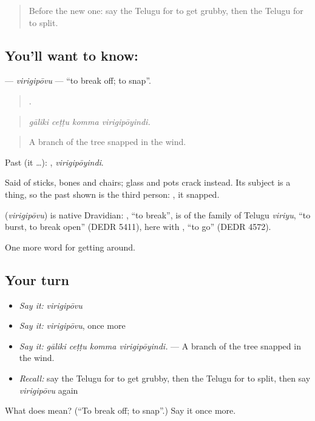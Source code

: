 \label{lesson:TE-C490-virigipovu}



\begin{quote}
Before the new one: say the Telugu for to get grubby, then the Telugu for to split.
\end{quote}

\subsection*{You'll want to know: }
\textbf{} — \emph{virigipōvu} — \textquotedblleft{}to break off; to snap\textquotedblright{}.

\begin{quote}
   .
\end{quote}

\begin{quote}
\emph{gāliki ceṭṭu komma virigipōyindi.}
\end{quote}

\begin{quote}
A branch of the tree snapped in the wind.
\end{quote}

Past (it …): , \emph{virigipōyindi}.

Said of sticks, bones and chairs; glass and pots crack instead. Its subject is a thing, so the past shown is the third person: , it snapped.

\begin{cousinweb}
\textbf{} (\emph{virigipōvu}) is native Dravidian: , \textquotedblleft{}to break\textquotedblright{}, is of the family of Telugu \emph{viriyu}, \textquotedblleft{}to burst, to break open\textquotedblright{} (DEDR 5411), here with , \textquotedblleft{}to go\textquotedblright{} (DEDR 4572).
\end{cousinweb}

\begin{grammarlens}[title={What you've built}]
One more word for getting around.
\end{grammarlens}

\subsection*{Your turn}
\begin{itemize}
\raggedright
  \item \emph{Say it:} \emph{virigipōvu}
  \item \emph{Say it:} \emph{virigipōvu}, once more
  \item \emph{Say it:} \emph{gāliki ceṭṭu komma virigipōyindi.} — A branch of the tree snapped in the wind.
  \item \emph{Recall:} say the Telugu for to get grubby, then the Telugu for to split, then say \emph{virigipōvu} again
\end{itemize}

\begin{tcolorbox}[breakable,colback=teal!4,colframe=teal!35!black,title={Before you move on}]
What does  mean? (\textquotedblleft{}To break off; to snap\textquotedblright{}.) Say it once more.
\end{tcolorbox}
